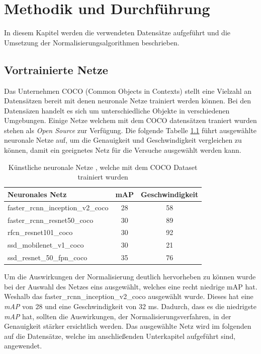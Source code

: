 \chapter{Methodik und Durchführung}\label{s.methudurchf}
In diesem Kapitel werden die verwendeten Datensätze aufgeführt und die Umsetzung der Normalisierungsalgorithmen beschrieben.  
 \section{Vortrainierte Netze}\label{s.modell}
Das Unternehmen COCO \cite{common2018data} (Common Objects in Contexts) stellt eine Vielzahl an Datensätzen bereit mit denen neuronale Netze trainiert werden können. Bei den Datensäzen handelt es sich um unterschiedliche Objekte in verschiedenen Umgebungen.  
Einige Netze welchem mit dem COCO datensätzen traniert wurden stehen als \textit{Open Source} zur Verfügung. Die folgende Tabelle \ref{tab:cocomodels} führt ausgewählte neuronale Netze auf, um die Genauigkeit und Geschwindigkeit vergleichen zu können, damit ein geeignetes Netz für die Versuche ausgewählt werden kann.
\begin{table}
[h]
\caption{Künstliche neuronale Netze \cite{google2018tens}, welche mit dem COCO Dataset trainiert wurden \cite{common2018data}} 
\label{tab:cocomodels}
\centering
\begin{tabular}{|l|c|c|}
\hline
Neuronales Netz & mAP & Geschwindigkeit\\
\hline
faster\_rcnn\_inception\_v2\_coco & 28 & 58\\
faster\_rcnn\_resnet50\_coco & 30 & 89\\
rfcn\_resnet101\_coco & 30 & 92\\
ssd\_mobilenet\_v1\_coco & 30 & 21\\
ssd\_resnet\_50\_fpn\_coco & 35 & 76\\
\hline
\end{tabular}
\end{table}
Um die Auswirkungen der Normalisierung deutlich hervorheben zu können wurde bei der Auswahl des Netzes eins ausgewählt, welches eine recht niedrige mAP hat. Weshalb das faster\_rcnn\_inception\_v2\_coco ausgewählt wurde. Dieses hat eine \textit{mAP} von 28 und eine Geschwindigkeit von 32 ms. Dadurch, dass es die niedrigste \textit{mAP} hat, sollten die Auswirkungen, der Normalisierungsverfahren, in der Genauigkeit stärker ersichtlich werden. Das ausgewählte Netz wird im folgenden auf die Datensätze, welche im anschließenden Unterkapitel aufgeführt sind, angewendet.
